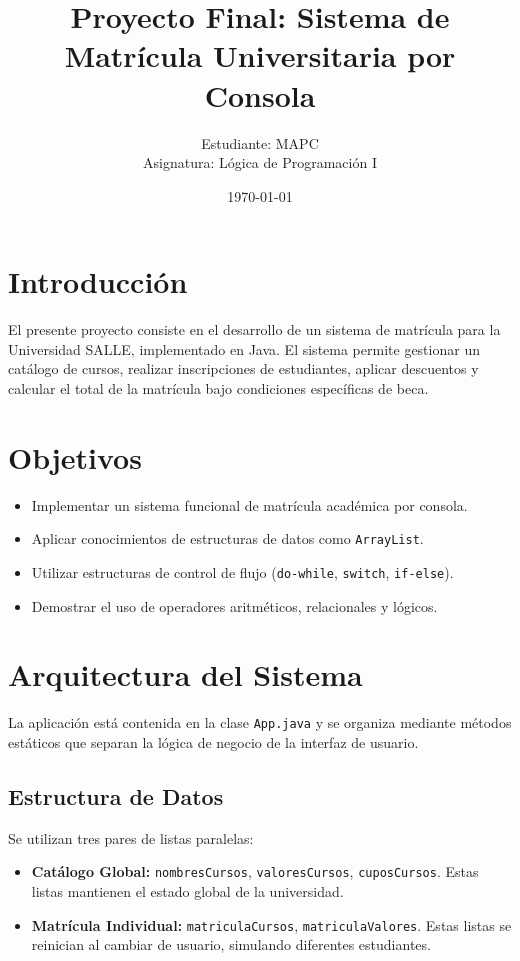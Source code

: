 \documentclass[12pt,a4paper]{article}
\title{Proyecto Final: Sistema de Matrícula Universitaria por Consola}
\author{Estudiante: MAPC \\ Asignatura: Lógica de Programación I}
\date{\today}
\begin{document}
\maketitle
\newpage

\tableofcontents
\newpage

\section{Introducción}
El presente proyecto consiste en el desarrollo de un sistema de matrícula para la Universidad SALLE, implementado en Java. El sistema permite gestionar un catálogo de cursos, realizar inscripciones de estudiantes, aplicar descuentos y calcular el total de la matrícula bajo condiciones específicas de beca.

\section{Objetivos}
\begin{itemize}
    \item Implementar un sistema funcional de matrícula académica por consola.
    \item Aplicar conocimientos de estructuras de datos como \texttt{ArrayList}.
    \item Utilizar estructuras de control de flujo (\texttt{do-while}, \texttt{switch}, \texttt{if-else}).
    \item Demostrar el uso de operadores aritméticos, relacionales y lógicos.
\end{itemize}

\section{Arquitectura del Sistema}
La aplicación está contenida en la clase \texttt{App.java} y se organiza mediante métodos estáticos que separan la lógica de negocio de la interfaz de usuario.

\subsection{Estructura de Datos}
Se utilizan tres pares de listas paralelas:
\begin{itemize}
    \item \textbf{Catálogo Global:} \texttt{nombresCursos}, \texttt{valoresCursos}, \texttt{cuposCursos}. Estas listas mantienen el estado global de la universidad.
    \item \textbf{Matrícula Individual:} \texttt{matriculaCursos}, \texttt{matriculaValores}. Estas listas se reinician al cambiar de usuario, simulando diferentes estudiantes.
\end{itemize}
\end{document}
